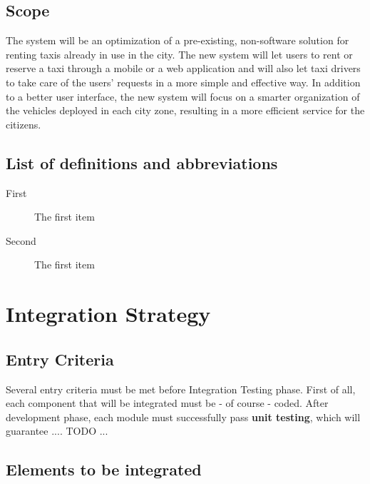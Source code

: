 \documentclass[a4paper, 11pt]{article}
\begin{document}
\subsection{Scope} %
\label{sub:scope}
The system will be an optimization of a pre-existing, non-software solution for renting taxis already in use in the city. The new system will let users to rent or reserve a taxi through a mobile or a web application and will also let taxi drivers to take care of the users' requests in a more simple and effective way. In addition to a better user interface, the new system will focus on a smarter organization of the vehicles deployed in each city zone, resulting in a more efficient service for the citizens.


\subsection{List of definitions and abbreviations} 
\label{sub:list_of_definitions_and_abbreviations}

\begin{description}
    \item[First] The first item
    \item[Second] The first item 
\end{description}

\section{Integration Strategy} 
\label{sec:integration_strategy}

\subsection{Entry Criteria} 
\label{sub:entry_criteria}
Several entry criteria must be met before Integration Testing phase. 
First of all, each component that will be integrated must be - of course - coded. After development phase, each module must successfully pass \textbf{unit testing}, which will guarantee .... TODO ...

\subsection{Elements to be integrated} 
\label{sub:elements_to_be_integrated}

\begin{figure}[htb]
    \centering
    \label{fig:testplan}
\end{figure}
\end{document}
